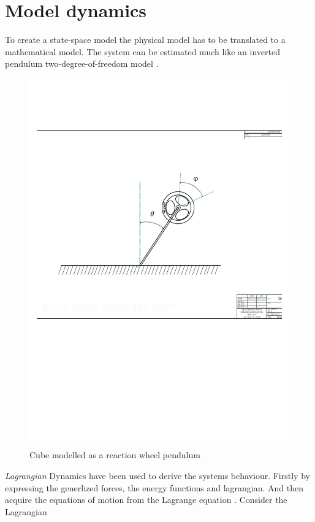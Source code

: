 \documentclass[a4paper,11pt]{kth-mag}
\begin{document}
\section{Model dynamics} \label{chapter: state space}
To create a state-space model the physical model has to be translated to a mathematical model. The system can be estimated much like an inverted pendulum two-degree-of-freedom model \cite{KTHpendulum}.
\begin{figure}[!htb]
\centering
\includegraphics[scale=.6]{Lagrangeflywheel.pdf}
\caption{Cube modelled as a reaction wheel pendulum}
\label{fig:Lagrangeflywheel}
\end{figure}

\emph{Lagrangian} Dynamics have been used to derive the systems behaviour. Firstly by expressing the generlized forces, the energy functions and lagrangian. And then acquire the equations of motion from the Lagrange equation  \cite{Lagrangref}. Consider the Lagrangian
\end{document}
